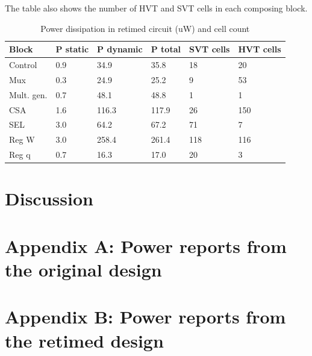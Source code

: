 \documentclass[11pt,a4paper]{article}
\begin{document}
The table also shows the number of HVT and SVT cells in each composing block.
\begin{table}[htbp]
\caption{Power dissipation in retimed circuit (uW) and cell count}
\begin{center}
\begin{tabular}{|l|l|l|l|l|l|} %
\hline
\textbf{Block}	& \textbf{P static}		& \textbf{P dynamic}	& \textbf{P total} & \textbf{SVT cells} & \textbf{HVT cells}\\ \hline
Control & 0.9 & 34.9 & 35.8 & 18 & 20 \\ \hline
Mux & 0.3 & 24.9 & 25.2 & 9 & 53 	\\ \hline
Mult. gen. & 0.7 & 48.1 & 48.8 & 1 & 1 	\\ \hline
CSA & 1.6 & 116.3 & 117.9 & 26 & 150 	\\ \hline
SEL & 3.0 & 64.2 & 67.2 & 71 & 7 	\\ \hline
Reg W & 3.0 & 258.4 & 261.4 & 118 & 116 	\\ \hline
Reg q & 0.7 & 16.3 & 17.0 & 20 & 3 \\ \hline
\end{tabular}
\end{center}
\label{table:powerRetimed}
\end{table}

\section{Discussion}

\section{Appendix A: Power reports from the original design}

\section{Appendix B: Power reports from the retimed design}



\end{document}
